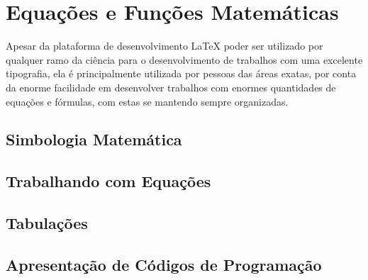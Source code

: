 \chapter{Equações e Funções Matemáticas}

Apesar da plataforma de desenvolvimento LaTeX poder ser utilizado por qualquer ramo da ciência para o desenvolvimento de trabalhos com uma excelente tipografia, ela é principalmente utilizada por pessoas das áreas exatas, por conta da enorme facilidade em desenvolver trabalhos com enormes quantidades de equações e fórmulas, com estas se mantendo sempre organizadas.
\section{Simbologia Matemática}
\section{Trabalhando com Equações}
\section{Tabulações}
\section{Apresentação de Códigos de Programação}
